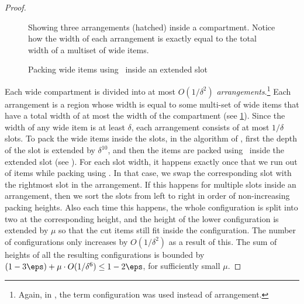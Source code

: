 \begin{proof}

\begin{figure}
    \centering
        
    \caption{Showing three arrangements (hatched) inside a compartment. Notice how the width of each arrangement is exactly equal to the total width of a multiset of wide items.}
\label{fig:arrangements}
\end{figure}


\begin{figure}
    \centering
    
    \caption{Packing wide items using \NFDH~inside an extended slot}
\label{fig:nfdhcrossing}
\end{figure}

Each wide compartment is divided into at most $O(1/\delta^2)$ \textit{arrangements}.\footnote{Again, in \cite{3d-strip-packing, jansen-pradel-bin-packing}, the term configuration was used instead of arrangement.} Each arrangement is a region whose width is equal to some multi-set of wide items that have a total width of at most the width of the compartment (see \cref{fig:arrangements}). Since the width of any wide item is at least $\delta$, each arrangement consists of at most $1/\delta$ slots. %
To pack the wide items inside the slots, in the algorithm of \cite{3d-strip-packing}, first the depth of the slot is extended by $\delta^{10}$, and then the items are packed using \NFDH~inside the extended slot (see ). 
For each slot width, it happens exactly once that we run out of items while packing using \NFDH. In that case, we swap the corresponding slot with the rightmost slot in the arrangement. If this happens for multiple slots inside an arrangement, then we sort the slots from left to right in order of non-increasing packing heights. Also each time this happens, the whole configuration is split into two at the corresponding height, and the height of the lower configuration is extended by $\mu$ so that the cut items still fit inside the configuration. The number of configurations only increases by $O(1/\delta^2)$ as a result of this. The sum of heights of all the resulting configurations is bounded by $(1-3\eps)+\mu\cdot O(1/\delta^6) \le 1-2\eps$, for sufficiently small $\mu$.


\end{proof}
